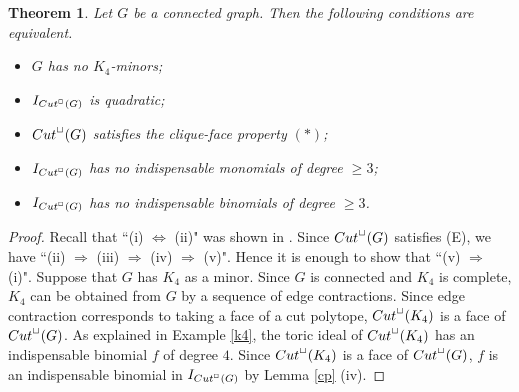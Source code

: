 \documentclass[10pt,a4paper]{amsart}
\newtheorem{thm}{Theorem} [section]
\numberwithin{thm}{section}
\numberwithin{equation}{section}
\begin{document}
\begin{thm}
    Let $G$ be a connected graph.
    Then the following conditions are equivalent.
    \begin{itemize}
        \item[{\rm (i)}] 
        $G$ has no $K_4$-minors{\rm ;}
    
        \item[{\rm (ii)}] 
        $I_{{\rm Cut}^\Box(G)}$ is quadratic{\rm ;}

        \item[{\rm (iii)}] 
        ${\rm Cut}^\Box(G)$ satisfies the clique-face property $(*)${\rm ;}

        
        \item[{\rm (iv)}] 
        $I_{{\rm Cut}^\Box(G)}$ has no indispensable monomials of degree $\ge 3${\rm ;}

        \item[{\rm (v)}] 
        $I_{{\rm Cut}^\Box(G)}$ has no indispensable binomials of degree $\ge 3$.
        
    \end{itemize}
\end{thm}

\begin{proof}
Recall that ``(i) $\Leftrightarrow$ (ii)" was shown in \cite{Eng}.
    Since ${\rm Cut}^\Box(G)$ satisfies (E), we have
    ``(ii) $\Rightarrow $ (iii) $\Rightarrow $ (iv) $\Rightarrow $ (v)".
Hence 
it is enough to show that ``(v) $\Rightarrow $ (i)".
Suppose that $G$ has $K_4$ as a minor.
Since $G$ is connected and $K_4$ is complete, $K_4$ can be obtained from $G$ by a sequence of edge contractions. 
Since edge contraction corresponds to taking a face of a cut polytope, ${\rm Cut}^\Box(K_4)$ is a face of ${\rm Cut}^\Box(G)$.
As explained in Example \ref{k4},  
the toric ideal of ${\rm Cut}^\Box(K_4)$ has an indispensable binomial $f$ of degree $4$.
Since
${\rm Cut}^\Box(K_4)$ is a face of ${\rm Cut}^\Box(G)$, $f$ is an indispensable binomial in $I_{{\rm Cut}^\Box(G)}$ by Lemma \ref{cp} (iv).
\end{proof}
\end{document}
